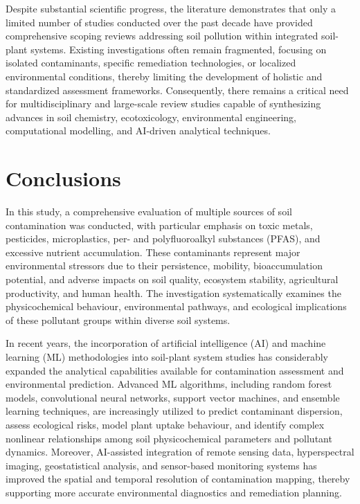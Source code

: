 \documentclass[preprint,12pt]{elsarticle}            %
\begin{document}
Despite substantial scientific progress, the literature demonstrates that only
a limited number of studies conducted over the past decade have provided
comprehensive scoping reviews addressing soil pollution within integrated
soil-plant systems. Existing investigations often remain fragmented, focusing
on isolated contaminants, specific remediation technologies, or localized
environmental conditions, thereby limiting the development of holistic and
standardized assessment frameworks. Consequently, there remains a critical need
for multidisciplinary and large-scale review studies capable of synthesizing
advances in soil chemistry, ecotoxicology, environmental engineering,
computational modelling, and AI-driven analytical techniques.

\section{Conclusions}\label{sec6}

In this study, a comprehensive evaluation of multiple sources of soil
contamination was conducted, with particular emphasis on toxic metals,
pesticides, microplastics, per- and polyfluoroalkyl substances (PFAS), and
excessive nutrient accumulation. These contaminants represent major
environmental stressors due to their persistence, mobility, bioaccumulation
potential, and adverse impacts on soil quality, ecosystem stability,
agricultural productivity, and human health. The investigation systematically
examines the physicochemical behaviour, environmental pathways, and ecological
implications of these pollutant groups within diverse soil systems.

In recent years, the incorporation of artificial intelligence (AI) and machine
learning (ML) methodologies into soil-plant system studies has considerably
expanded the analytical capabilities available for contamination assessment
and environmental prediction. Advanced ML algorithms, including random forest
models, convolutional neural networks, support vector machines, and ensemble
learning techniques, are increasingly utilized to predict contaminant
dispersion, assess ecological risks, model plant uptake behaviour, and identify
complex nonlinear relationships among soil physicochemical parameters and
pollutant dynamics. Moreover, AI-assisted integration of remote sensing data,
hyperspectral imaging, geostatistical analysis, and sensor-based monitoring
systems has improved the spatial and temporal resolution of contamination
mapping, thereby supporting more accurate environmental diagnostics and
remediation planning.
\end{document}
